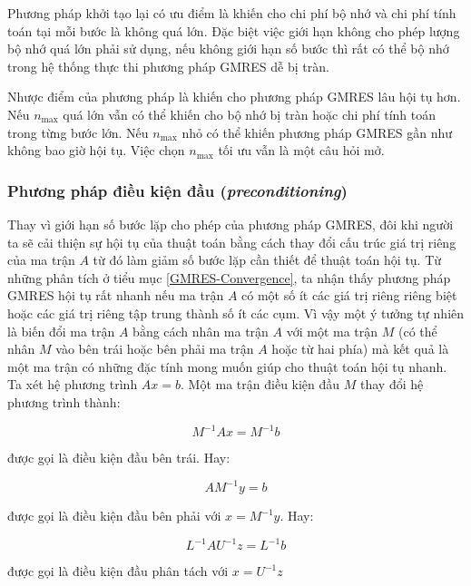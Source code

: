 \documentclass[14pt, a4paper]{article}
\numberwithin{equation}{section}
\numberwithin{algorithm}{section}
\numberwithin{figure}{section}
\numberwithin{dl}{section}
\numberwithin{md}{section}
\numberwithin{bd}{section}
\numberwithin{dn}{section}
\begin{document}
Phương pháp khởi tạo lại có ưu điểm là khiến cho chi phí bộ nhớ và chi phí tính toán tại mỗi bước là không quá lớn. Đặc biệt việc giới hạn không cho phép lượng bộ nhớ quá lớn phải sử dụng, nếu không giới hạn số bước thì rất có thể bộ nhớ trong hệ thống thực thi phương pháp GMRES dễ bị tràn.

Nhược điểm của phương pháp là khiến cho phương pháp GMRES lâu hội tụ hơn. Nếu $n_{\max}$ quá lớn vẫn có thể khiến cho bộ nhớ bị tràn hoặc chi phí tính toán trong từng bước lớn. Nếu $n_{\max}$ nhỏ có thể khiến phương pháp GMRES gần như không bao giờ hội tụ. Việc chọn $n_{\max}$ tối ưu vẫn là một câu hỏi mở.

\subsubsection{Phương pháp điều kiện đầu (\textit{preconditioning})} \label{GMRES-Precondition}

Thay vì giới hạn số bước lặp cho phép của phương pháp GMRES, đôi khi người ta sẽ cải thiện sự hội tụ của thuật toán bằng cách thay đổi cấu trúc giá trị riêng của ma trận $A$ từ đó làm giảm số bước lặp cần thiết để thuật toán hội tụ.
Từ những phân tích ở tiểu mục \ref{GMRES-Convergence}, ta nhận thấy phương pháp GMRES hội tụ rất nhanh nếu ma trận $A$ có một số ít các giá trị riêng riêng biệt hoặc các giá trị riêng tập trung thành số ít các cụm. Vì vậy một ý tưởng tự nhiên là biến đổi ma trận $A$ bằng cách nhân ma trận $A$ với một ma trận $M$ (có thể nhân $M$ vào bên trái hoặc bên phải ma trận $A$ hoặc từ hai phía) mà kết quả là một ma trận có những đặc tính mong muốn giúp cho thuật toán hội tụ nhanh.
Ta xét hệ phương trình $Ax=b$. Một ma trận điều kiện đầu $M$ thay đổi hệ phương trình thành:

\begin{equation}
    M^{-1}Ax = M^{-1}b
\end{equation}

được gọi là điều kiện đầu bên trái. Hay:

\begin{equation}
    AM^{-1}y = b
\end{equation}

được gọi là điều kiện đầu bên phải với $x=M^{-1}y$. Hay:

\begin{equation}
    L^{-1}AU^{-1}z = L^{-1}b
\end{equation}

được gọi là điều kiện đầu phân tách với $x=U^{-1}z$
\end{document}
